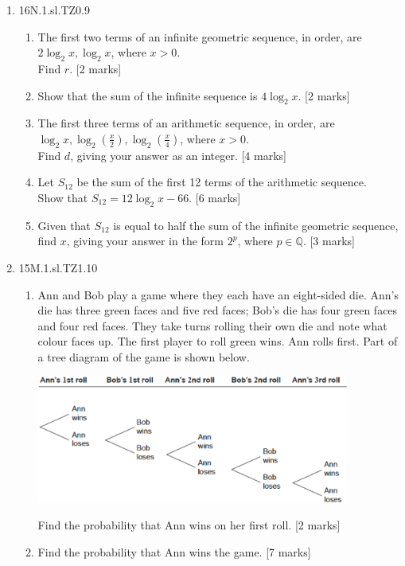\documentclass[12pt, twoside]{article}
\begin{document}
\begin{enumerate}
\item 16N.1.sl.TZ0.9
\begin{enumerate}
  \item The first two terms of an infinite geometric sequence, in order, are $2 \log_2 x, \log_2 x$, where $x>0$.\\
  Find $r$. [2 marks]
  \item Show that the sum of the infinite sequence is $4\log_2 x$. [2 marks]
  \item The first three terms of an arithmetic sequence, in order, are $\log_2 x, \log_2 (\frac{x}{2}), \log_2 (\frac{x}{4})$, where $x>0$.\\
  Find $d$, giving your answer as an integer. [4 marks]
  \item Let $S_{12}$ be the sum of the first 12 terms of the arithmetic sequence.\\
  Show that $S_{12} = 12 \log_2 x -66$. [6 marks]
  \item Given that $S_{12}$ is equal to half the sum of the infinite geometric sequence, find $x$, giving your answer in the form $2^p$, where $p \in \mathbb{Q}$. [3 marks]
\end{enumerate}

\item 15M.1.sl.TZ1.10
\begin{enumerate}
  \item Ann and Bob play a game where they each have an eight-sided die. Ann’s die has three green faces and five red faces; Bob’s die has four green faces and four red faces. They take turns rolling their own die and note what colour faces up. The first player to roll green wins. Ann rolls first. Part of a tree diagram of the game is shown below.
  \begin{center}
    \includegraphics[width=0.85\textwidth]{1-1-P1_Algebra-17.png}
  \end{center}
  Find the probability that Ann wins on her first roll. [2 marks]
  \item Find the probability that Ann wins the game. [7 marks]
\end{enumerate}



\end{enumerate}
\end{document}
